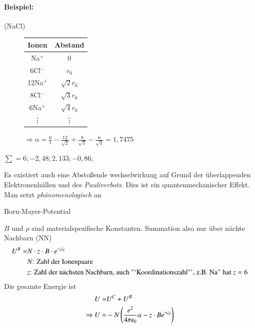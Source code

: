 \documentclass[paper=A4,12pt,pagesize,twoside,BCOR=8mm,ngerman]{scrartcl}
\begin{document}
				\paragraph*{Beispiel:} (NaCl)\\
				\begin{figure}[H]
					\centering
					\begin{minipage}[c]{0.5\textwidth}
						\centering
						\begin{tabular}{cc}
							\toprule{}
							Ionen		&	Abstand		\\
							\midrule{}
							Na$^{+}$	&	0			\\
							6Cl$^{-}$	&	$r_{0}$		\\
							12Na$^{+}$	&	$\sqrt{2}r_{0}$\\
							8Cl$^{-}$	&	$\sqrt{3}r_{0}$\\
							6Na$^{+}$	&	$\sqrt{4}r_{0}$\\
							\vdots		&	\vdots{}	\\
							\bottomrule
						\end{tabular}
					\end{minipage}	
					\begin{minipage}[c]{0.49\textwidth}
						$\Rightarrow \alpha = \frac{6}{1} - 
						\frac{12}{\sqrt{2}} + \frac{8}{\sqrt{3}} - 
						\frac{6}{\sqrt{4}} = 1,7475$
					\end{minipage}
				\end{figure}
				
				$\sum = 6; -2,48; 2,133; -0,86;$
				
				Es existiert auch eine Abstoßende wechselwirkung auf 
				Grund der überlappenden Elektronenhüllen und des 
				\emph{Pauliverbots}. Dies ist ein quantenmechanischer 
				Effekt. Man setzt \emph{phänomenologisch} an
				\begin{center}
					Born-Mayer-Potential
				\end{center}	
				$B$ und $\rho$ sind materialspezifische Konstanten. 
				Summation also nur über nächte Nachbarn (NN)
				\begin{align*}
					U^{B} = & N \cdot z \cdot B \cdot 
					e^{\nicefrac{r_{ij}}{\rho}}\\
					& \text{$N$: Zahl der Ionenpaare}\\
					& \text{$z$: Zahl der nächsten Nachbarn, auch 
					"`Koordinationszahl"', z.B. Na$^{+}$ hat $z = 6$}					
				\end{align*}
				Die gesamte Energie ist 
				\begin{align*}
					U = & U^{C} + U^{B}\\
					\Rightarrow U = & -N \left( 
					\frac{e^{2}}{4\pi\epsilon_{0}} \alpha - z \cdot B 
					e^{ \nicefrac{ r_{0} }{ \rho} } \right)
				\end{align*}
\end{document}
